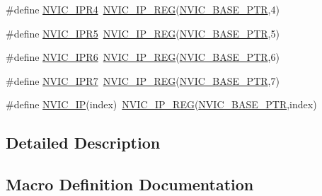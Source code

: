 \begin{DoxyCompactItemize}
\#define \hyperlink{group___n_v_i_c___register___accessor___macros_ga2f5750fd7f9ff72cda865eb7192afae3}{N\+V\+I\+C\+\_\+\+I\+P\+R4}~\hyperlink{group___n_v_i_c___register___accessor___macros_gab650200327187b4594896adc6e6e1d53}{N\+V\+I\+C\+\_\+\+I\+P\+\_\+\+R\+EG}(\hyperlink{group___n_v_i_c___peripheral_ga28f0a055d0c218e16d1fc7b13ff0caa5}{N\+V\+I\+C\+\_\+\+B\+A\+S\+E\+\_\+\+P\+TR},4)
\item 
\#define \hyperlink{group___n_v_i_c___register___accessor___macros_ga86802cec04cf0988062781f67bcaad9a}{N\+V\+I\+C\+\_\+\+I\+P\+R5}~\hyperlink{group___n_v_i_c___register___accessor___macros_gab650200327187b4594896adc6e6e1d53}{N\+V\+I\+C\+\_\+\+I\+P\+\_\+\+R\+EG}(\hyperlink{group___n_v_i_c___peripheral_ga28f0a055d0c218e16d1fc7b13ff0caa5}{N\+V\+I\+C\+\_\+\+B\+A\+S\+E\+\_\+\+P\+TR},5)
\item 
\#define \hyperlink{group___n_v_i_c___register___accessor___macros_ga0986846cc9f1bf5c816ec885eda9aed8}{N\+V\+I\+C\+\_\+\+I\+P\+R6}~\hyperlink{group___n_v_i_c___register___accessor___macros_gab650200327187b4594896adc6e6e1d53}{N\+V\+I\+C\+\_\+\+I\+P\+\_\+\+R\+EG}(\hyperlink{group___n_v_i_c___peripheral_ga28f0a055d0c218e16d1fc7b13ff0caa5}{N\+V\+I\+C\+\_\+\+B\+A\+S\+E\+\_\+\+P\+TR},6)
\item 
\#define \hyperlink{group___n_v_i_c___register___accessor___macros_gaef45ccd66db0bd808d945cdfa64d622b}{N\+V\+I\+C\+\_\+\+I\+P\+R7}~\hyperlink{group___n_v_i_c___register___accessor___macros_gab650200327187b4594896adc6e6e1d53}{N\+V\+I\+C\+\_\+\+I\+P\+\_\+\+R\+EG}(\hyperlink{group___n_v_i_c___peripheral_ga28f0a055d0c218e16d1fc7b13ff0caa5}{N\+V\+I\+C\+\_\+\+B\+A\+S\+E\+\_\+\+P\+TR},7)
\item 
\#define \hyperlink{group___n_v_i_c___register___accessor___macros_gaf1f0534e262976cb2ae04360e5a226a2}{N\+V\+I\+C\+\_\+\+IP}(index)~\hyperlink{group___n_v_i_c___register___accessor___macros_gab650200327187b4594896adc6e6e1d53}{N\+V\+I\+C\+\_\+\+I\+P\+\_\+\+R\+EG}(\hyperlink{group___n_v_i_c___peripheral_ga28f0a055d0c218e16d1fc7b13ff0caa5}{N\+V\+I\+C\+\_\+\+B\+A\+S\+E\+\_\+\+P\+TR},index)
\end{DoxyCompactItemize}


\subsection{Detailed Description}


\subsection{Macro Definition Documentation}
\mbox{\label{group___n_v_i_c___register___accessor___macros_gaac08461a730870d217b9b5780d3dbf87}} 
